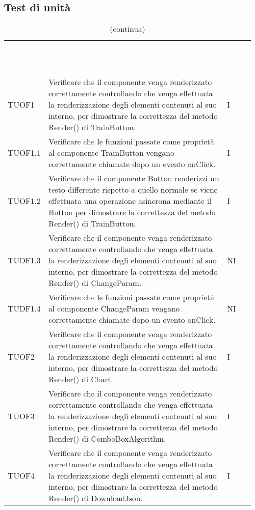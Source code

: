 \subsection{Test di unità}
\begin{longtable}{C{2cm} L{8cm} C{2cm}}
\caption{Tabella dei test di unità} \\
\textcolor{white}{\textbf{Codice}} &
\textcolor{white}{\textbf{Descrizione}} &
\textcolor{white}{\textbf{Esito}} \\
		\endfirsthead
		\caption[]{(continua)} \\
\textcolor{white}{\textbf{Codice}} &
\textcolor{white}{\textbf{Descrizione}} &
\textcolor{white}{\textbf{Esito}} \\
		\endhead
TUOF1 & Verificare che il componente venga renderizzato correttamente controllando che venga effettuata la renderizzazione degli elementi contenuti al suo interno, per dimostrare la correttezza del metodo Render() di TrainButton. & I \\
TUOF1.1 & Verificare che le funzioni passate come proprietà al componente TrainButton vengano correttamente chiamate dopo un evento onClick. & I \\
TUOF1.2 & Verificare che il componente Button renderizzi un testo differente rispetto a quello normale se viene effettuata una operazione asincrona mediante il Button per dimostrare la correttezza del metodo Render() di TrainButton. & I\\
TUDF1.3 & Verificare che il componente venga renderizzato correttamente controllando che venga effettuata la renderizzazione degli elementi contenuti al suo interno, per dimostrare la correttezza del metodo Render() di ChangeParam. & NI \\
TUDF1.4 & Verificare che le funzioni passate come proprietà al componente ChangeParam vengano correttamente chiamate dopo un evento onClick. & NI \\
TUOF2 & Verificare che il componente venga renderizzato correttamente controllando che venga effettuata la renderizzazione degli elementi contenuti al suo interno, per dimostrare la correttezza del metodo Render() di Chart. & I \\
TUOF3 & Verificare che il componente venga renderizzato correttamente controllando che venga effettuata la renderizzazione degli elementi contenuti al suo interno, per dimostrare la correttezza del metodo Render() di ComboBoxAlgorithm. & I \\
TUOF4 & Verificare che il componente venga renderizzato correttamente controllando che venga effettuata la renderizzazione degli elementi contenuti al suo interno, per dimostrare la correttezza del metodo Render() di DownloadJson. & I \\

\end{longtable}
